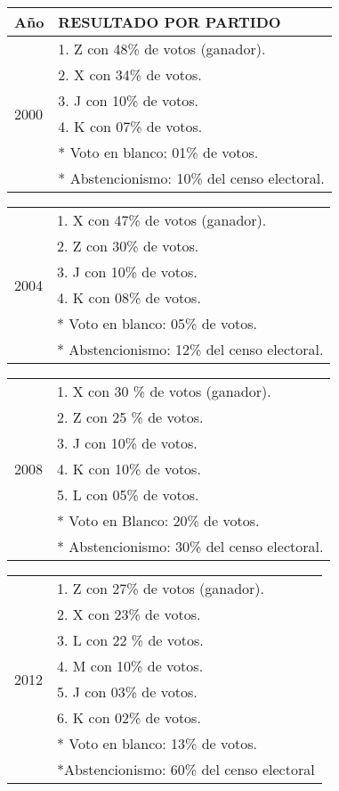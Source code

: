 \begin{enumerate}
 \begin{tabular}{p{1cm}||p{6cm}}
 \hline  \hline
Año & RESULTADO POR PARTIDO \\
\hline  \hline
\multirow{6}{*}{2000} & 1. Z con 48\% de votos (ganador). \\
 & 2. X con 34\% de votos.\\
 & 3. J con 10\% de votos.\\
& 4. K con 07\% de votos.\\
& * Voto en blanco: 01\% de votos.	\\
	& * Abstencionismo: 10\% del censo electoral.\\
	\hline
\end{tabular} 
\begin{tabular}{p{1cm}||p{6cm}}
\hline
\multirow{6}{*}{2004}& 1. X con 47\% de votos (ganador).\\
& 2.  Z con 30\% de votos.\\
& 3.  J con 10\% de votos.\\
& 4.  K con 08\% de votos.\\
& * Voto en blanco: 05\% de votos.\\
& * Abstencionismo: 12\% del censo electoral.\\ 
\hline
\end{tabular} 
\begin{tabular}{p{1cm}||p{6cm}}
\hline
\multirow{7}{*}{2008}& 1. X con 30 \% de votos (ganador).\\
			&		 2.  Z con 25 \% de votos.\\
			&		 3.  J con 10\% de votos.\\
			&		 4. K con 10\% de votos.\\
			&		 5. L con 05\% de votos.\\
			&		 * Voto en Blanco: 20\% de votos.\\
			&		 * Abstencionismo: 30\% del censo electoral.\\
			\hline
\end{tabular} 
\begin{tabular}{p{1cm}||p{6cm}}
\hline
\multirow{8}{*}{2012}&1. Z con 27\% de votos (ganador).\\
			&		  2.  X con 23\% de votos.\\
			&		  3.  L con 22 \% de votos.\\
			&		  4.  M con 10\% de votos.\\
			&		  5.  J con 03\%  de votos.\\
			&		  6.  K con 02\% de votos.\\
			&		  * Voto en blanco: 13\% de votos.\\
			&		  *Abstencionismo: 60\% del censo electoral \\
			\hline \hline
\end{tabular}  



\end{enumerate}
